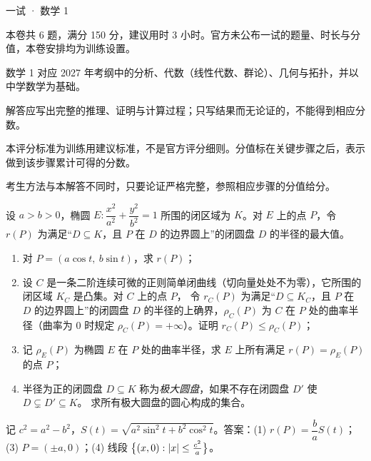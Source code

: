 \documentclass[cjk=noto, seal=first]{mojing-exam}
\begin{document}
\begin{paper}[time={建议 3 小时（训练设置）}, full=150]{一试 · 数学 1}

\begin{instructions}
  \item 本卷共 6 题，满分 150 分，建议用时 3 小时。官方未公布一试的题量、时长与分值，本卷安排均为训练设置。
  \item 数学 1 对应 2027 年考纲中的分析、代数（线性代数、群论）、几何与拓扑，并以中学数学为基础。
  \item 解答应写出完整的推理、证明与计算过程；只写结果而无论证的，不能得到相应分数。
\end{instructions}

\begin{gradingnotes}
  \item 本评分标准为训练用建议标准，不是官方评分细则。分值标在关键步骤之后，表示做到该步骤累计可得的分数。
  \item 考生方法与本解答不同时，只要论证严格完整，参照相应步骤的分值给分。
\end{gradingnotes}


\begin{questions}

\question[25]
设 $a>b>0$，椭圆 $E\colon\dfrac{x^2}{a^2}+\dfrac{y^2}{b^2}=1$ 所围的闭区域为 $K$。对 $E$ 上的点 $P$，令 $r(P)$
为满足“$D\subseteq K$，且 $P$ 在 $D$ 的边界圆上”的闭圆盘 $D$ 的半径的最大值。
\begin{enumerate}
  \item 对 $P=(a\cos t,\ b\sin t)$，求 $r(P)$；
  \item 设 $C$ 是一条二阶连续可微的正则简单闭曲线（切向量处处不为零），它所围的闭区域 $K_C$ 是凸集。对 $C$ 上的点 $P$，
        令 $r_C(P)$ 为满足“$D\subseteq K_C$，且 $P$ 在 $D$ 的边界圆上”的闭圆盘 $D$ 的半径的上确界，$\rho_C(P)$ 为 $C$ 在 $P$
        处的曲率半径（曲率为 $0$ 时规定 $\rho_C(P)=+\infty$）。证明 $r_C(P)\le\rho_C(P)$；
  \item 记 $\rho_E(P)$ 为椭圆 $E$ 在 $P$ 处的曲率半径，求 $E$ 上所有满足 $r(P)=\rho_E(P)$ 的点 $P$；
  \item 半径为正的闭圆盘 $D\subseteq K$ 称为\emph{极大圆盘}，如果不存在闭圆盘 $D'$ 使 $D\subsetneq D'\subseteq K$。
        求所有极大圆盘的圆心构成的集合。
\end{enumerate}
\answerspace{2cm}
\begin{solution}
记 $c^2=a^2-b^2$，$S(t)=\sqrt{a^2\sin^2t+b^2\cos^2t}$。答案：(1) $r(P)=\dfrac ba S(t)$；(3) $P=(\pm a,0)$；(4) 线段 $\bigl\{(x,0):\lvert x\rvert\le\frac{c^2}a\bigr\}$。


\end{solution}
\end{questions}
\end{paper}
\end{document}
